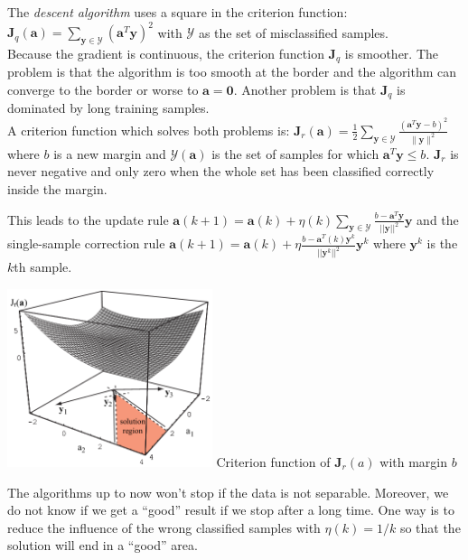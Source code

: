     
    \begin{minipage}{12cm}
    The \emph{descent algorithm} uses a square in the criterion function:
	$\bm J_q(\bm a) = \sum\limits_{\bm y \in \mathcal{Y}} (\bm a^T \bm y)^2$ with $\mathcal{Y}$ as the set
    of misclassified samples.\\
    
  	Because the gradient is continuous, the criterion function $\bm J_q$ is smoother. The problem is that the algorithm is too smooth at the border and 
  	the algorithm can converge to the border or worse to $\bm a=\bm 0$. 
  	Another problem is that $\bm J_q$ is dominated by long training samples. \\
  	
  	A criterion function which solves both problems is: 
  	$\bm J_r(\bm a) = \frac{1}{2} \sum\limits_{\bm y \in \mathcal{Y}} \frac{(\bm a^T \bm y - b)^2}{\|\bm y\|^2}$
  	where $b$ is a new margin and $\mathcal{Y}(\bm a)$ is the set of samples for which $\bm a^T \bm y \leq b$. $\bm J_r$ is never 
  	negative and only zero when the whole set has been classified correctly inside the margin.
  	
  	This leads to the update rule
  	$\mathbf{a}(k+1) = \mathbf{a}(k) + \eta(k)\sum_{\mathbf{y}\in\mathcal{Y}}\frac{b-\mathbf{a}^T\mathbf{y}}{||\mathbf{y}||^2}\mathbf{y}$
  	and the single-sample correction rule
  	$\mathbf{a}(k+1) = \mathbf{a}(k) + \eta \frac{b-\mathbf{a}^T(k)\mathbf{y}^k}{||\mathbf{y}^k||^2}\mathbf{y}^k$
  	where $\mathbf{y}^k$ is the $k$th sample.
	   
    \end{minipage}
    \hspace{8mm}
    \begin{minipage}{6.4cm}
    	 \includegraphics[width=6cm]{./images/relaxation.png}
    	 Criterion function of $\bm J_r(a)$ with margin $b$
    \end{minipage}
    
    The algorithms up to now won't stop if the data is not separable. Moreover, we do not know if we get a ``good'' result if we stop after a long time.
    One way is to reduce the influence of the wrong classified samples with $\eta(k)=1/k$ so that the solution will end in a ``good'' area.
    
